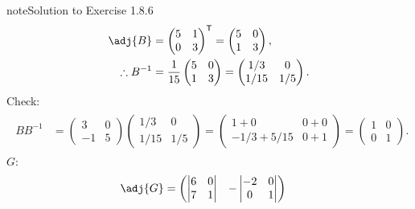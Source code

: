 \documentclass[letterpaper,10pt,english]{jupyterBook}
\begin{document}
\begin{sphinxadmonition}{note}{Solution to Exercise 1.8.6}
\begin{equation*}
\begin{split}
\begin{align*}
    \adj{B} &=
    \begin{pmatrix} 5 & 1 \\ 0 & 3 \end{pmatrix}^\mathsf{T}
    =
    \begin{pmatrix} 5 & 0 \\ 1 & 3 \end{pmatrix}, \\
    \therefore B^{-1} &= \frac{1}{15} \begin{pmatrix} 5 & 0 \\ 1 & 3 \end{pmatrix} 
    =
    \begin{pmatrix} 1/3 & 0 \\ 1/15 & 1/5 \end{pmatrix}.
\end{align*} \end{split}
\end{equation*}
\sphinxAtStartPar
Check:
\begin{equation*}
\begin{split} \begin{align*}
    BB^{-1} &=
    \begin{pmatrix} 3 & 0 \\ -1 & 5 \end{pmatrix}
    \begin{pmatrix} 1/3 & 0 \\ 1/15 & 1/5 \end{pmatrix}
    =
    \begin{pmatrix} 1 + 0 & 0 + 0 \\ -1/3 + 5/15 & 0 + 1 \end{pmatrix}
    =
    \begin{pmatrix} 1 & 0 \\ 0 & 1 \end{pmatrix}.
\end{align*} \end{split}
\end{equation*}
\sphinxAtStartPar
\(G\):
\begin{equation*}
\begin{split} \begin{align*}
    \adj{G} &= 
    \begin{pmatrix}
          \begin{vmatrix} 6 & 0 \\ 7 & 1 \end{vmatrix} 
        &
        - \begin{vmatrix} -2 & 0 \\ 0 & 1 \end{vmatrix}

\end{pmatrix}
\end{align*}
\end{split}
\end{equation*}
\end{sphinxadmonition}
\end{document}

